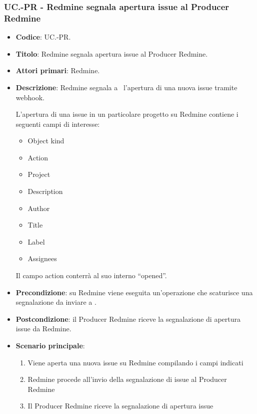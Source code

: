 \subsubsection{UC\theuccount.\thesubuccount-PR - Redmine segnala apertura issue al Producer Redmine}
\begin{itemize}
	\item \textbf{Codice}: UC\theuccount.\thesubuccount-PR.
	\item \textbf{Titolo}: Redmine segnala apertura issue al Producer Redmine.
	\item \textbf{Attori primari}: Redmine.
	\item \textbf{Descrizione}: Redmine segnala a \progetto\ l'apertura di una nuova issue tramite webhook.

	L'apertura di una issue in un particolare progetto su Redmine contiene i seguenti campi di interesse:
	\begin{itemize}
        \item Object kind
        \item Action
        \item Project
        \item Description
        \item Author
        \item Title
        \item Label
        \item Assignees
    \end{itemize}
	Il campo action conterrà al suo interno ``opened''.
		\item \textbf{Precondizione}: su Redmine viene eseguita un'operazione che scaturisce una
    segnalazione da inviare a \progetto.
	\item \textbf{Postcondizione}: il Producer Redmine riceve la segnalazione di apertura issue da Redmine.
	\item \textbf{Scenario principale}:
	\begin{enumerate}
		\item Viene aperta una nuova issue su Redmine compilando i campi indicati
		\item Redmine procede all'invio della segnalazione di issue al Producer Redmine
        \item Il Producer Redmine riceve la segnalazione di apertura issue
	\end{enumerate}

\end{itemize}


